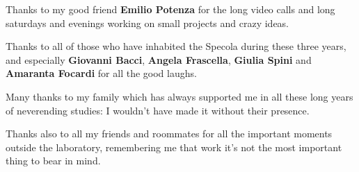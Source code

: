 Thanks to my good friend \textbf{Emilio Potenza} for the long video calls and long saturdays and evenings working on small projects and crazy ideas.

Thanks to all of those who have inhabited the Specola during these three years, and especially \textbf{Giovanni Bacci}, \textbf{Angela Frascella}, \textbf{Giulia Spini} and \textbf{Amaranta Focardi} for all the good laughs.

Many thanks to my family which has always supported me in all these long years of neverending studies: I wouldn't have made it without their presence.

Thanks also to all my friends and roommates for all the important moments outside the laboratory, remembering me that work it's not the most important thing to bear in mind.

\endgroup




